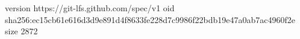 version https://git-lfs.github.com/spec/v1
oid sha256:ec15cb61e616d3d9e891d4f8633fe228d7c9986f22bdb19e47a0ab7ac4960f2e
size 2872
